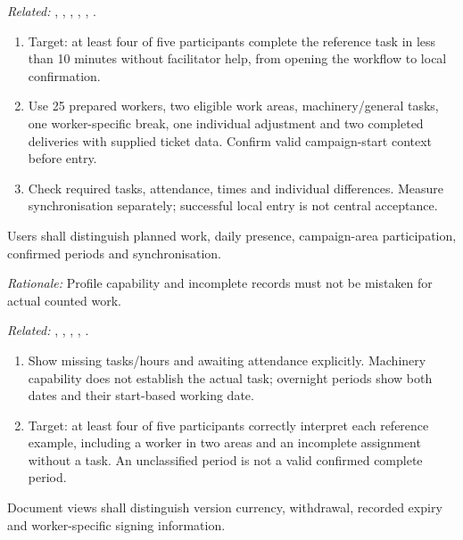 \textit{Related:} \hyperref[fr:024]{}, \hyperref[fr:031]{}, \hyperref[fr:032]{}, \hyperref[fr:035]{}, \hyperref[fr:047]{}, \hyperref[fr:049]{}.
\begin{enumerate}[label=(\alph*),leftmargin=*,itemsep=1pt,topsep=3pt]
\item Target: at least four of five participants complete the reference task in less than 10 minutes without facilitator help, from opening the workflow to local confirmation.
\item Use 25 prepared workers, two eligible work areas, machinery/general tasks, one worker-specific break, one individual adjustment and two completed deliveries with supplied ticket data. Confirm valid campaign-start context before entry.
\item Check required tasks, attendance, times and individual differences. Measure synchronisation separately; successful local entry is not central acceptance.
\end{enumerate}

\label{nfr:USA-03}
Users shall distinguish planned work, daily presence, campaign-area participation, confirmed periods and synchronisation.

\textit{Rationale:} Profile capability and incomplete records must not be mistaken for actual counted work.

\textit{Related:} \hyperref[fr:020]{}, \hyperref[fr:028]{}, \hyperref[fr:030]{}, \hyperref[fr:031]{}, \hyperref[fr:033]{}.
\begin{enumerate}[label=(\alph*),leftmargin=*,itemsep=1pt,topsep=3pt]
\item Show missing tasks/hours and awaiting attendance explicitly. Machinery capability does not establish the actual task; overnight periods show both dates and their start-based working date.
\item Target: at least four of five participants correctly interpret each reference example, including a worker in two areas and an incomplete assignment without a task. An unclassified period is not a valid confirmed complete period.
\end{enumerate}

\label{nfr:USA-04}
Document views shall distinguish version currency, withdrawal, recorded expiry and worker-specific signing information.

